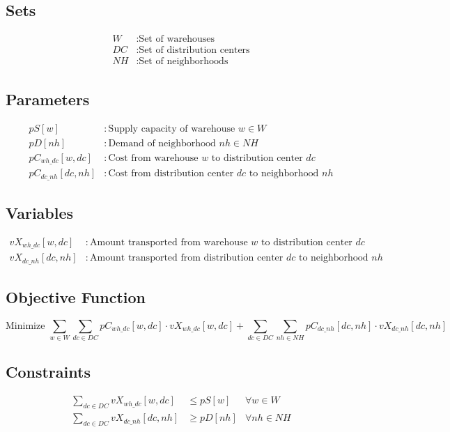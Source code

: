 \documentclass[12pt]{article}
\begin{document}
\subsection*{Sets}
\begin{align*}
W & : \text{Set of warehouses} \\
DC & : \text{Set of distribution centers} \\
NH & : \text{Set of neighborhoods}
\end{align*}

\subsection*{Parameters}
\begin{align*}
pS[w] & : \text{Supply capacity of warehouse } w \in W \\
pD[nh] & : \text{Demand of neighborhood } nh \in NH \\
pC_{wh\_dc}[w, dc] & : \text{Cost from warehouse } w \text{ to distribution center } dc \\
pC_{dc\_nh}[dc, nh] & : \text{Cost from distribution center } dc \text{ to neighborhood } nh
\end{align*}

\subsection*{Variables}
\begin{align*}
vX_{wh\_dc}[w, dc] & : \text{Amount transported from warehouse } w \text{ to distribution center } dc \\
vX_{dc\_nh}[dc, nh] & : \text{Amount transported from distribution center } dc \text{ to neighborhood } nh
\end{align*}

\subsection*{Objective Function}
\[
\text{Minimize } \sum_{w \in W} \sum_{dc \in DC} pC_{wh\_dc}[w, dc] \cdot vX_{wh\_dc}[w, dc] + \sum_{dc \in DC} \sum_{nh \in NH} pC_{dc\_nh}[dc, nh] \cdot vX_{dc\_nh}[dc, nh]
\]

\subsection*{Constraints}
\begin{align*}
\sum_{dc \in DC} vX_{wh\_dc}[w, dc] & \leq pS[w] & \forall w \in W \\
\sum_{dc \in DC} vX_{dc\_nh}[dc, nh] & \geq pD[nh] & \forall nh \in NH
\end{align*}
\end{document}
